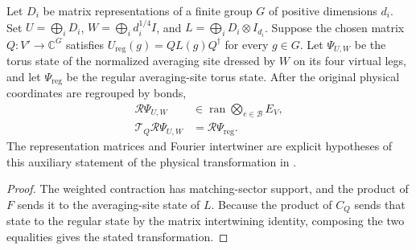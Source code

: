 \begin{lemma}%
    \label{thm:peps_torus_semiregular_chosen_fourier_state}
    \leanok
    Let $D_i$ be matrix representations of a finite group $G$ of
    positive dimensions $d_i$. Set
    $U=\bigoplus_iD_i$, $W=\bigoplus_i d_i^{1/4}I$, and
    $L=\bigoplus_i D_i\otimes I_{d_i}$.
    Suppose the chosen matrix $Q:V'\to\mathbb C^G$ satisfies
    $U_{\mathrm{reg}}(g)=QL(g)Q^\dagger$ for every $g\in G$.
    Let $\Psi_{U,W}$ be the torus state of the normalized
    averaging site dressed by $W$ on its four virtual legs, and let
    $\Psi_{\mathrm{reg}}$ be the regular averaging-site torus state.
    After the original physical coordinates are regrouped by bonds,
    \begin{align}
        \mathcal R\Psi_{U,W}
         & \in\operatorname{ran}\bigotimes_{e\in\mathcal B}E_V, \\
        \mathcal T_Q\mathcal R\Psi_{U,W}
         & =\mathcal R\Psi_{\mathrm{reg}}.
    \end{align}
    The representation matrices and Fourier intertwiner are explicit
    hypotheses of this auxiliary statement of the physical transformation
    in \cite[Section~7]{Schuch2010PEPS}.
\end{lemma}
\begin{proof}\leanok
    The weighted contraction has matching-sector support, and
    the product of $F$ sends it to the averaging-site state of $L$.
    Because the product of $C_Q$ sends that state to the regular state
    by the matrix intertwining identity, composing the two equalities gives
    the stated transformation.
\end{proof}

